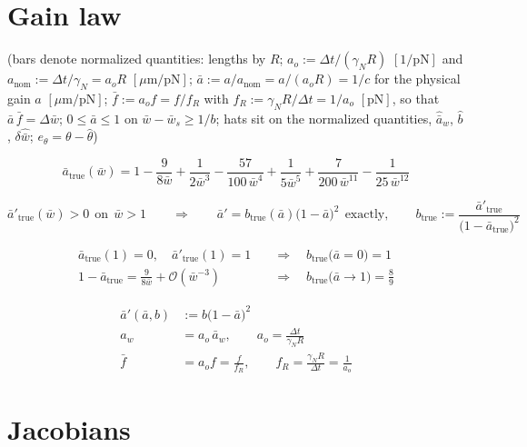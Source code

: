 \documentclass[11pt,a4paper,fontset=none]{ctexart}
\newcommand{\ba}{\bar{a}}
\newcommand{\bw}{\bar{w}}
\begin{document}
\section{Gain law}

(bars denote normalized quantities: lengths by $R$;
$a_o := \Delta t/(\gamma_N R)$ $[1/\mathrm{pN}]$ and
$a_{\mathrm{nom}} := \Delta t/\gamma_N = a_o R$ $[\mu\mathrm{m}/\mathrm{pN}]$;
$\ba := a/a_{\mathrm{nom}} = a/(a_o R) = 1/c$ for the physical gain
$a$ $[\mu\mathrm{m}/\mathrm{pN}]$;
$\bar{f} := a_o f = f/f_R$ with $f_R := \gamma_N R/\Delta t = 1/a_o$ $[\mathrm{pN}]$,
so that $\ba\,\bar{f} = \Delta\bw$;
$0 \le \ba \le 1$ on $\bw - \bw_s \ge 1/b$;
hats sit on the normalized quantities, $\hat{\ba}_w$, $\hat{b}$, $\delta\hat{\bw}$;
$e_{\theta} = \theta - \hat{\theta}$)

\begin{equation*}
\ba_{\mathrm{true}}(\bw) = 1 - \frac{9}{8\bw} + \frac{1}{2\bw^{3}}
  - \frac{57}{100\,\bw^{4}} + \frac{1}{5\bw^{5}}
  + \frac{7}{200\,\bw^{11}} - \frac{1}{25\,\bw^{12}}
\end{equation*}

\begin{equation*}
\ba'_{\mathrm{true}}(\bw) > 0 \ \ \text{on} \ \ \bw > 1
\qquad\Longrightarrow\qquad
\ba' = b_{\mathrm{true}}(\ba)\bigl(1-\ba\bigr)^{2}
\ \ \text{exactly},
\qquad
b_{\mathrm{true}} := \frac{\ba'_{\mathrm{true}}}
  {\bigl(1-\ba_{\mathrm{true}}\bigr)^{2}}
\end{equation*}

\begin{align*}
\ba_{\mathrm{true}}(1) = 0, \quad \ba'_{\mathrm{true}}(1) = 1
  &\quad\Longrightarrow\quad b_{\mathrm{true}}\bigl(\ba = 0\bigr) = 1 \\
1 - \ba_{\mathrm{true}} = \frac{9}{8\bw} + \mathcal{O}(\bw^{-3})
  &\quad\Longrightarrow\quad b_{\mathrm{true}}\bigl(\ba \to 1\bigr) = \frac{8}{9}
\end{align*}

\begin{align*}
\ba'(\ba,b) &:= b\bigl(1-\ba\bigr)^{2} \\
a_w &= a_o\,\ba_w , \qquad a_o = \frac{\Delta t}{\gamma_N R} \\
\bar{f} &= a_o f = \frac{f}{f_R}, \qquad f_R = \frac{\gamma_N R}{\Delta t} = \frac{1}{a_o}
\end{align*}

\section{Jacobians}
\end{document}
